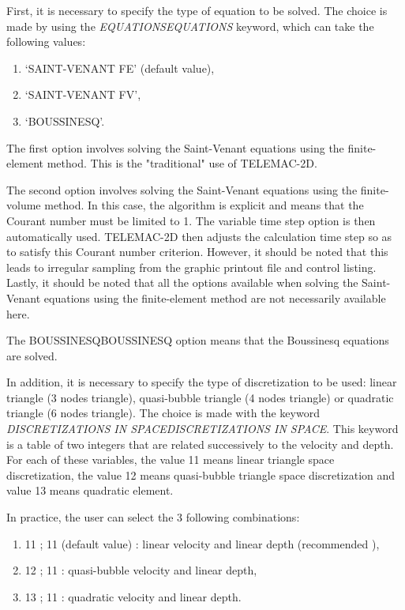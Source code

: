 \documentclass{article} %
\begin{document}
 First, it is necessary to specify the type of equation to be solved. The choice is made by using the \textit{EQUATIONSEQUATIONS} keyword, which can take the following values:

\begin{enumerate}
\item  `SAINT-VENANT FE' (default value),

\item  `SAINT-VENANT FV',

\item  `BOUSSINESQ'.
\end{enumerate}

 The first option involves solving the Saint-Venant equations using the finite-element method. This is the "traditional" use of TELEMAC-2D.

 The second option involves solving the Saint-Venant equations using the finite-volume method. In this case, the algorithm is explicit and means that the Courant number must be limited to 1. The variable time step option is then automatically used. TELEMAC-2D then adjusts the calculation time step so as to satisfy this Courant number criterion. However, it should be noted that this leads to irregular sampling from the graphic printout file and control listing. Lastly, it should be noted that all the options available when solving the Saint-Venant equations using the finite-element method are not necessarily available here.

 The BOUSSINESQBOUSSINESQ option means that the Boussinesq equations are solved.

 In addition, it is necessary to specify the type of discretization to be used: linear triangle (3 nodes triangle), quasi-bubble triangle (4 nodes triangle) or quadratic triangle (6 nodes triangle). The choice is made with the keyword \textit{DISCRETIZATIONS IN SPACEDISCRETIZATIONS IN SPACE}. This keyword is a table of two integers that are related successively to the velocity and depth. For each of these variables, the value 11 means linear triangle space discretization, the value 12 means quasi-bubble triangle space discretization and value 13 means quadratic element.

  In practice, the user can select the 3 following combinations:

\begin{enumerate}
\item  11 ; 11 (default value) : linear velocity and linear depth (recommended ),

\item  12 ; 11 : quasi-bubble velocity and linear depth,

\item  13 ; 11 : quadratic velocity and linear depth.
\end{enumerate}
\end{document}
